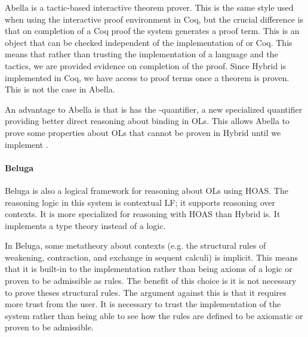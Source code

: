 Abella is a tactic-based interactive theorem prover. This is the same style used when using the interactive proof environment in Coq, but the crucial difference is that on completion of a Coq proof the system generates a proof term. This is an object that can be checked independent of the implementation of \cic{} or Coq. This means that rather than trusting the implementation of a language and the tactics, we are provided evidence on completion of the proof. Since Hybrid is implemented in Coq, we have access to proof terms once a theorem is proven. This is not the case in Abella.

An advantage to Abella is that is has the \nabla-quantifier, a new specialized quantifier providing better direct reasoning about binding in OLs. This allows Abella to prove some properties about OLs that cannot be proven in Hybrid until we implement \nabla.

\paragraph{Beluga}

Beluga is also a logical framework for reasoning about OLs using HOAS. The reasoning logic in this system is contextual LF; it supports reasoning over contexts. It is more specialized for reasoning with HOAS than Hybrid is. It implements a type theory instead of a logic.

In Beluga, some metatheory about contexts (e.g. the structural rules of weakening, contraction, and exchange in sequent calculi) is implicit. This means that it is built-in to the implementation rather than being axioms of a logic or proven to be admissible as rules. The benefit of this choice is it is not necessary to prove theses structural rules. The argument against this is that it requires more trust from the user. It is necessary to trust the implementation of the system rather than being able to see how the rules are defined to be axiomatic or proven to be admissible.
